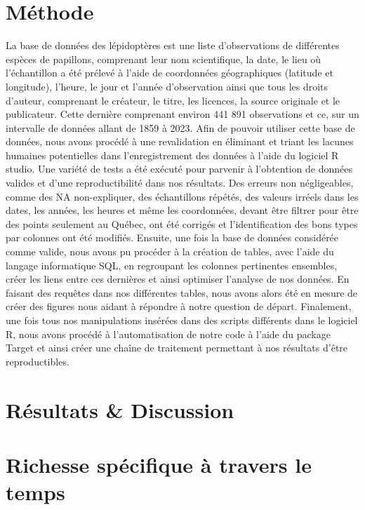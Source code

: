 \documentclass[9pt,twocolumn,twoside,]{pnas-new}
\begin{document}
\section*{Méthode}\label{muxe9thode}

La base de données des lépidoptères est une liste d'observations de
différentes espèces de papillons, comprenant leur nom scientifique, la
date, le lieu où l'échantillon a été prélevé à l'aide de coordonnées
géographiques (latitude et longitude), l'heure, le jour et l'année
d'observation ainsi que tous les droits d'auteur, comprenant le
créateur, le titre, les licences, la source originale et le publicateur.
Cette dernière comprenant environ 441 891 observations et ce, sur un
intervalle de données allant de 1859 à 2023. Afin de pouvoir utiliser
cette base de données, nous avons procédé à une revalidation en
éliminant et triant les lacunes humaines potentielles dans
l'enregistrement des données à l'aide du logiciel R studio. Une variété
de tests a été exécuté pour parvenir à l'obtention de données valides et
d'une reproductibilité dans nos résultats. Des erreurs non négligeables,
comme des NA non-expliquer, des échantillons répétés, des valeurs
irréels dans les dates, les années, les heures et même les coordonnées,
devant être filtrer pour être des points seulement au Québec, ont été
corrigés et l'identification des bons types par colonnes ont été
modifiés. Ensuite, une fois la base de données considérée comme valide,
nous avons pu procéder à la création de tables, avec l'aide du langage
informatique SQL, en regroupant les colonnes pertinentes ensembles,
créer les liens entre ces dernières et ainsi optimiser l'analyse de nos
données. En faisant des requêtes dans nos différentes tables, nous avons
alors été en mesure de créer des figures nous aidant à répondre à notre
question de départ. Finalement, une fois tous nos manipulations insérées
dans des scripts différents dans le logiciel R, nous avons procédé à
l'automatisation de notre code à l'aide du package Target et ainsi créer
une chaîne de traitement permettant à nos résultats d'être
reproductibles.

\section*{Résultats \& Discussion}\label{ruxe9sultats-discussion}

\section*{Richesse spécifique à travers le
temps}\label{richesse-spuxe9cifique-uxe0-travers-le-temps}
\end{document}

